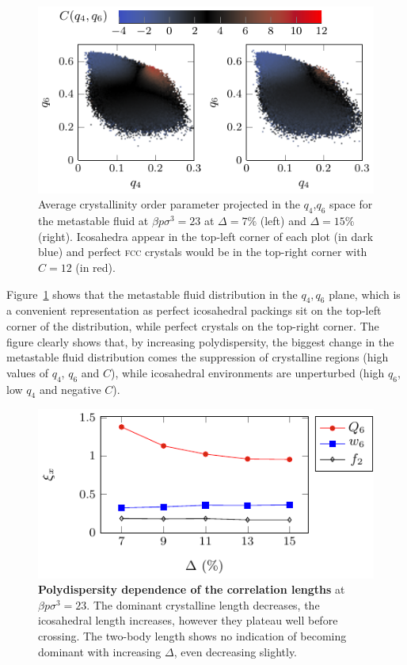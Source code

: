 \documentclass[twocolumn,superscriptaddress]{revtex4}
\begin{document}
\begin{figure}
 \centering
 \includegraphics{fig_Cmaps}
 \caption{Average crystallinity order parameter projected in the $q_4$,$q_6$ space for the metastable fluid at $\beta p\sigma^3=23$ at $\Delta=7\%$ (left) and $\Delta=15\%$ (right). Icosahedra appear in the top-left corner of each plot (in dark blue) and perfect \textsc{fcc} crystals would be in the top-right corner with $C=12$ (in red).}
 \label{fig:Cmaps}
\end{figure}


Figure~\ref{fig:Cmaps} shows that the metastable fluid distribution in the $q_4,q_6$ plane, which is a convenient
representation as perfect icosahedral packings sit on the top-left corner of the distribution, while perfect crystals on
the top-right corner. The figure clearly shows that, by increasing polydispersity, the biggest change in the metastable fluid
distribution comes the suppression of crystalline regions (high values of
$q_4$, $q_6$ and $C$), while icosahedral environments are unperturbed (high $q_6$, low $q_4$ and negative $C$).



\begin{figure}
 \centering
 \includegraphics{fig_lengthpoly}
	\caption{\textbf{Polydispersity dependence of the correlation lengths} at $\beta p\sigma^3=23$. The dominant crystalline length decreases, the icosahedral length increases, however they plateau well before crossing. The two-body length shows no indication of becoming dominant with increasing $\Delta$, even decreasing slightly.}
	\label{fig:lengthpoly}
\end{figure}
\end{document}
